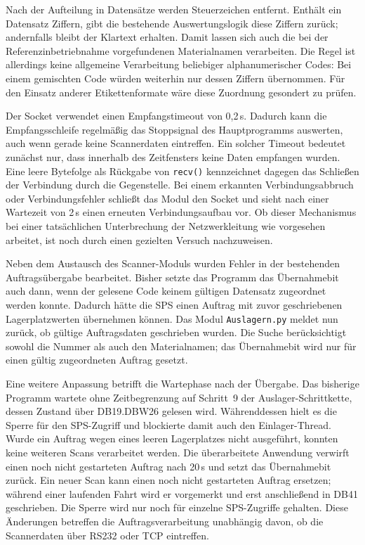 Nach der Aufteilung in Datensätze werden Steuerzeichen entfernt. Enthält ein Datensatz Ziffern, gibt die bestehende Auswertungslogik diese Ziffern zurück; andernfalls bleibt der Klartext erhalten. Damit lassen sich auch die bei der Referenzinbetriebnahme vorgefundenen Materialnamen verarbeiten. Die Regel ist allerdings keine allgemeine Verarbeitung beliebiger alphanumerischer Codes: Bei einem gemischten Code würden weiterhin nur dessen Ziffern übernommen. Für den Einsatz anderer Etikettenformate wäre diese Zuordnung gesondert zu prüfen.

Der Socket verwendet einen Empfangstimeout von 0,2\,s. Dadurch kann die Empfangsschleife regelmäßig das Stoppsignal des Hauptprogramms auswerten, auch wenn gerade keine Scannerdaten eintreffen. Ein solcher Timeout bedeutet zunächst nur, dass innerhalb des Zeitfensters keine Daten empfangen wurden. Eine leere Bytefolge als Rückgabe von \texttt{recv()} kennzeichnet dagegen das Schließen der Verbindung durch die Gegenstelle. \cite{python_socket_api} Bei einem erkannten Verbindungsabbruch oder Verbindungsfehler schließt das Modul den Socket und sieht nach einer Wartezeit von 2\,s einen erneuten Verbindungsaufbau vor. Ob dieser Mechanismus bei einer tatsächlichen Unterbrechung der Netzwerkleitung wie vorgesehen arbeitet, ist noch durch einen gezielten Versuch nachzuweisen.

Neben dem Austausch des Scanner-Moduls wurden Fehler in der bestehenden Auftragsübergabe bearbeitet. Bisher setzte das Programm das Übernahmebit auch dann, wenn der gelesene Code keinem gültigen Datensatz zugeordnet werden konnte. Dadurch hätte die SPS einen Auftrag mit zuvor geschriebenen Lagerplatzwerten übernehmen können. Das Modul \texttt{Auslagern.py} meldet nun zurück, ob gültige Auftragsdaten geschrieben wurden. Die Suche berücksichtigt sowohl die Nummer als auch den Materialnamen; das Übernahmebit wird nur für einen gültig zugeordneten Auftrag gesetzt.

Eine weitere Anpassung betrifft die Wartephase nach der Übergabe. Das bisherige Programm wartete ohne Zeitbegrenzung auf Schritt~9 der Auslager-Schrittkette, dessen Zustand über DB19.DBW26 gelesen wird. Währenddessen hielt es die Sperre für den SPS-Zugriff und blockierte damit auch den Einlager-Thread. Wurde ein Auftrag wegen eines leeren Lagerplatzes nicht ausgeführt, konnten keine weiteren Scans verarbeitet werden. Die überarbeitete Anwendung verwirft einen noch nicht gestarteten Auftrag nach 20\,s und setzt das Übernahmebit zurück. Ein neuer Scan kann einen noch nicht gestarteten Auftrag ersetzen; während einer laufenden Fahrt wird er vorgemerkt und erst anschließend in DB41 geschrieben. Die Sperre wird nur noch für einzelne SPS-Zugriffe gehalten. Diese Änderungen betreffen die Auftragsverarbeitung unabhängig davon, ob die Scannerdaten über RS232 oder TCP eintreffen.

